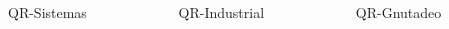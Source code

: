 \documentclass{beamer}
\begin{document}
\begin{frame}

\begin{columns}
  \begin{column}{.3\textwidth}
  \item QR-Sistemas
  \end{column}

  \begin{column}{.3\textwidth}
  \item QR-Industrial
  \end{column}

  \begin{column}{.3\textwidth}
  \item QR-Gnutadeo
  \end{column}
\end{columns}


\end{frame}
\end{document}
